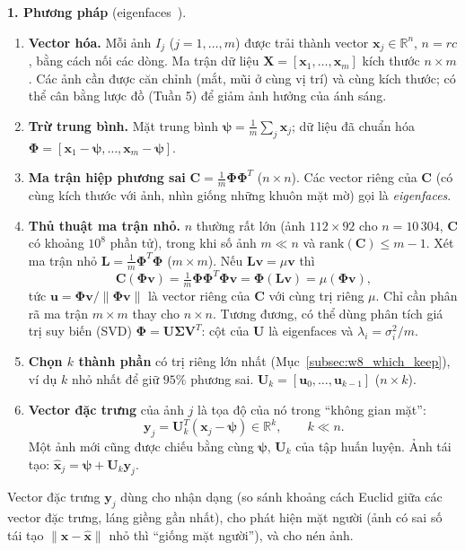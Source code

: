 \textbf{1. Phương pháp} (eigenfaces~\citep{sirovich1987low,turk1991eigenfaces}).
\begin{enumerate}
    \item \textbf{Vector hóa.} Mỗi ảnh $I_j$ ($j = 1, \ldots, m$) được trải thành vector $\mathbf{x}_j \in \mathbb{R}^n$, $n = rc$, bằng cách nối các dòng. Ma trận dữ liệu $\mathbf{X} = [\mathbf{x}_1, \ldots, \mathbf{x}_m]$ kích thước $n \times m$. Các ảnh cần được căn chỉnh (mắt, mũi ở cùng vị trí) và cùng kích thước; có thể cân bằng lược đồ (Tuần 5) để giảm ảnh hưởng của ánh sáng.
    \item \textbf{Trừ trung bình.} Mặt trung bình $\boldsymbol{\psi} = \frac{1}{m}\sum_j\mathbf{x}_j$; dữ liệu đã chuẩn hóa $\boldsymbol{\Phi} = [\mathbf{x}_1 - \boldsymbol{\psi}, \ldots, \mathbf{x}_m - \boldsymbol{\psi}]$.
    \item \textbf{Ma trận hiệp phương sai} $\mathbf{C} = \frac{1}{m}\boldsymbol{\Phi}\boldsymbol{\Phi}^T$ ($n \times n$). Các vector riêng của $\mathbf{C}$ (có cùng kích thước với ảnh, nhìn giống những khuôn mặt mờ) gọi là \emph{eigenfaces}.
    \item \textbf{Thủ thuật ma trận nhỏ.} $n$ thường rất lớn (ảnh $112 \times 92$ cho $n = 10\,304$, $\mathbf{C}$ có khoảng $10^8$ phần tử), trong khi số ảnh $m \ll n$ và $\mathrm{rank}(\mathbf{C}) \le m - 1$. Xét ma trận nhỏ $\mathbf{L} = \frac{1}{m}\boldsymbol{\Phi}^T\boldsymbol{\Phi}$ ($m \times m$). Nếu $\mathbf{L}\mathbf{v} = \mu\mathbf{v}$ thì
    \begin{equation}
    \mathbf{C}(\boldsymbol{\Phi}\mathbf{v}) = \tfrac{1}{m}\boldsymbol{\Phi}\boldsymbol{\Phi}^T\boldsymbol{\Phi}\mathbf{v} = \boldsymbol{\Phi}(\mathbf{L}\mathbf{v}) = \mu(\boldsymbol{\Phi}\mathbf{v}),
    \end{equation}
    tức $\mathbf{u} = \boldsymbol{\Phi}\mathbf{v}/\|\boldsymbol{\Phi}\mathbf{v}\|$ là vector riêng của $\mathbf{C}$ với cùng trị riêng $\mu$. Chỉ cần phân rã ma trận $m \times m$ thay cho $n \times n$. Tương đương, có thể dùng phân tích giá trị suy biến (SVD) $\boldsymbol{\Phi} = \mathbf{U}\boldsymbol{\Sigma}\mathbf{V}^T$: cột của $\mathbf{U}$ là eigenfaces và $\lambda_i = \sigma_i^2/m$.
    \item \textbf{Chọn $k$ thành phần} có trị riêng lớn nhất (Mục~\ref{subsec:w8_which_keep}), ví dụ $k$ nhỏ nhất để giữ $95\%$ phương sai. $\mathbf{U}_k = [\mathbf{u}_0, \ldots, \mathbf{u}_{k-1}]$ ($n \times k$).
    \item \textbf{Vector đặc trưng} của ảnh $j$ là tọa độ của nó trong ``không gian mặt'':
    \begin{equation}
    \mathbf{y}_j = \mathbf{U}_k^T(\mathbf{x}_j - \boldsymbol{\psi}) \in \mathbb{R}^k, \qquad k \ll n.
    \label{eq:w8_feature}
    \end{equation}
    Một ảnh mới cũng được chiếu bằng cùng $\boldsymbol{\psi}$, $\mathbf{U}_k$ của tập huấn luyện. Ảnh tái tạo: $\hat{\mathbf{x}}_j = \boldsymbol{\psi} + \mathbf{U}_k\mathbf{y}_j$.
\end{enumerate}
Vector đặc trưng $\mathbf{y}_j$ dùng cho nhận dạng (so sánh khoảng cách Euclid giữa các vector đặc trưng, láng giềng gần nhất), cho phát hiện mặt người (ảnh có sai số tái tạo $\|\mathbf{x} - \hat{\mathbf{x}}\|$ nhỏ thì ``giống mặt người''), và cho nén ảnh.

